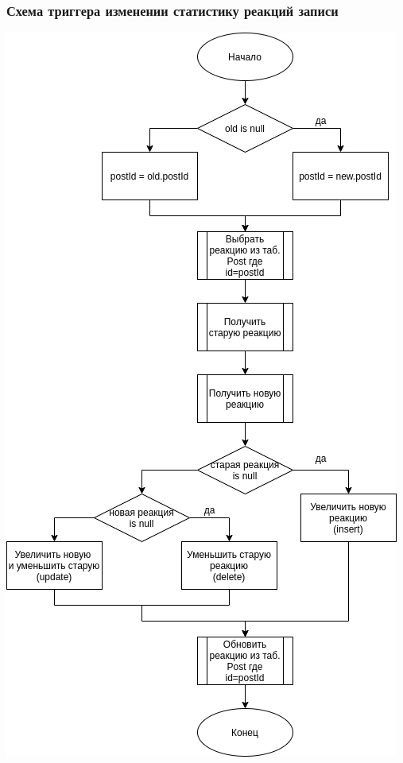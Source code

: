 \subsubsection*{Схема триггера изменении статистику реакций записи}
\includegraphics[width=0.8\linewidth]{img/trigger_change_reaction}




\pagebreak





